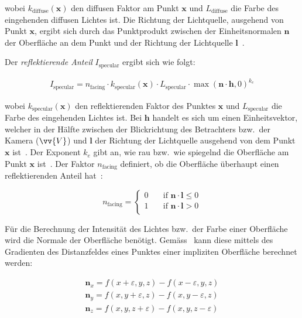 wobei $k_{\text{diffuse}}(\bm{x})$ den diffusen Faktor am Punkt $\bm{x}$
und $L_{\text{diffuse}}$ die Farbe des eingehenden diffusen Lichtes ist.
Die Richtung der Lichtquelle, ausgehend von Punkt $\bm{x}$, ergibt sich
durch das Punktprodukt zwischen der Einheitsnormalen $\bm{n}$ der
Oberfläche an dem Punkt und der Richtung der Lichtquelle
$\bm{l}$~\parencites[S. 724]{glassner_introduction_1989}[Kapitel 5, Abschnitt 5.2.1]{fernando_cg_2003}.

Der \textit{reflektierende Anteil} $I_{\text{specular}}$ ergibt sich
wie folgt:

\begin{gather}
    I_{\text{specular}} = n_{\text{facing}} \cdot k_{\text{specular}}(\bm{x}) \cdot L_{\text{specular}} \cdot \max{(\bm{n} \cdot \bm{h}, 0)}^{k_{e}}
\end{gather}

wobei $k_{\text{specular}}(\bm{x})$ den reflektierenden Faktor des
Punktes $\bm{x}$ und $L_{\text{specular}}$ die Farbe des eingehenden
Lichtes ist. Bei $\bm{h}$ handelt es sich um einen Einheitsvektor,
welcher in der Hälfte zwischen der Blickrichtung des Betrachters bzw.\
der Kamera ($\vv{V}$) und $\bm{l}$ der Richtung der Lichtquelle
ausgehend von dem Punkt $\bm{x}$ ist~\parencite[S.
731]{glassner_introduction_1989}. Der Exponent $k_{e}$ gibt an, wie rau
bzw.\ wie spiegelnd die Oberfläche am Punkt $\bm{x}$
ist~\parencite[Kapitel 5, Abschnitt 5.2.1]{fernando_cg_2003}. Der Faktor
$n_{\text{facing}}$ definiert, ob die Oberfläche überhaupt einen
reflektierenden Anteil hat~\parencite[Kapitel 5, Abschnitt 5.2.1]{fernando_cg_2003}:

\begin{equation}
    n_{\text{facing}} = \begin{cases}
        0 & \quad \text{if } \bm{n} \cdot \bm{l} \leq 0\\
        1 & \quad \text{if } \bm{n} \cdot \bm{l} > 0 \\
    \end{cases}
\end{equation}

Für die Berechnung der Intensität des Lichtes bzw.\ der Farbe einer Oberfläche
wird die Normale der Oberfläche benötigt. Gemäss~\citeauthor{hart_ray_1989}
kann diese mittels des Gradienten des Distanzfeldes
eines Punktes einer impliziten Oberfläche berechnet werden:

\begin{gather}
    \bm{n}_{x} = f(x + \varepsilon, y, z) - f(x - \varepsilon, y, z) \\
    \bm{n}_{y} = f(x, y + \varepsilon,  z) - f(x, y - \varepsilon,  z) \\
    \bm{n}_{z} = f(x, y, z + \varepsilon) - f(x, y, z - \varepsilon) \\
\end{gather}

